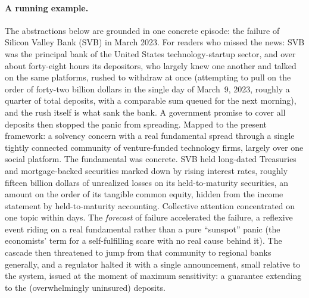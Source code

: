 \documentclass[11pt]{article}
\begin{document}
\paragraph{A running example.} The abstractions below are grounded in one concrete episode: the failure of Silicon Valley Bank (SVB) in March 2023. For readers who missed the news: SVB was the principal bank of the United States technology-startup sector, and over about forty-eight hours its depositors, who largely knew one another and talked on the same platforms, rushed to withdraw at once (attempting to pull on the order of forty-two billion dollars in the single day of March~9, 2023, roughly a quarter of total deposits, with a comparable sum queued for the next morning), and the rush itself is what sank the bank. A government promise to cover all deposits then stopped the panic from spreading. Mapped to the present framework: a solvency concern with a real fundamental spread through a single tightly connected community of venture-funded technology firms, largely over one social platform. The fundamental was concrete. SVB held long-dated Treasuries and mortgage-backed securities marked down by rising interest rates, roughly fifteen billion dollars of unrealized losses on its held-to-maturity securities, an amount on the order of its tangible common equity, hidden from the income statement by held-to-maturity accounting. Collective attention concentrated on one topic within days. The \emph{forecast} of failure accelerated the failure, a reflexive event riding on a real fundamental rather than a pure ``sunspot'' panic (the economists' term for a self-fulfilling scare with no real cause behind it). The cascade then threatened to jump from that community to regional banks generally, and a regulator halted it with a single announcement, small relative to the system, issued at the moment of maximum sensitivity: a guarantee extending to the (overwhelmingly uninsured) deposits.
\end{document}
